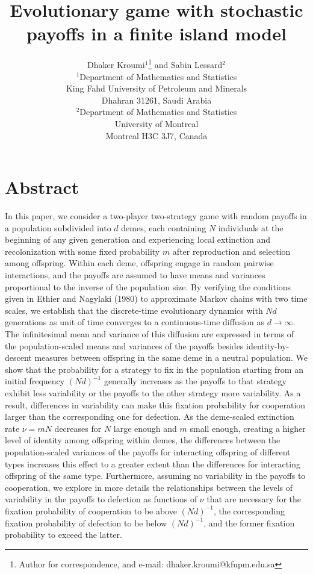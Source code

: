 \documentclass[11pt]{article}
\title{
\color{black}Evolutionary game with stochastic payoffs in a finite island model \color{black}}
\author{Dhaker Kroumi$^1$\footnote{Author for
correspondence, and e-mail: dhaker.kroumi@kfupm.edu.sa} and Sabin Lessard$^2$
\\$^1$Department of Mathematics and Statistics\\King Fahd University of Petroleum and Minerals\\Dhahran 31261, Saudi Arabia\\
$^2$Department of Mathematics and Statistics\\University of Montreal \\
 Montreal H3C 3J7, Canada\\
 }
\date{}
\begin{document}
\maketitle



\section*{Abstract}
In this paper, we consider a two-player two-strategy game with random payoffs in a population subdivided into $d$ demes, each containing $N$ individuals at the beginning of any given generation and experiencing local extinction and recolonization with some fixed probability $m$ after reproduction and selection among offspring. Within each deme, offspring engage in random pairwise interactions, and the payoffs are assumed to have means and variances proportional to the inverse of the population size. By verifying the conditions given in Ethier and Nagylaki (1980) to approximate Markov chains with two time scales, we establish that the discrete-time evolutionary dynamics with $Nd$ generations as unit of time converges to a continuous-time diffusion as $d\rightarrow\infty$. The infinitesimal mean and variance of this diffusion are expressed in terms of the population-scaled means and variances of the payoffs besides identity-by-descent measures between offspring in the same deme in a neutral population. We show that the probability for a strategy to fix in the population starting from an initial frequency $(Nd)^{-1}$ generally increases as the payoffs to that strategy exhibit less variability or the payoffs to the other strategy more variability. As a result, differences in variability can make this fixation probability for cooperation larger than the corresponding one for defection. As the deme-scaled extinction rate $\nu=mN$ decreases for $N$ large enough and $m$ small enough,  creating a higher level of identity among offspring within demes, the differences between the population-scaled variances of the payoffs for interacting offspring of different types increases this effect to a greater extent than the differences for interacting offspring of the same type. Furthermore, assuming no variability in the payoffs to cooperation, we explore in more details the relationships between the levels of variability in the payoffs to defection as functions of $\nu$ that are necessary for the fixation probability of cooperation to be above $(Nd)^{-1}$, the corresponding fixation probability of defection  to be below $(Nd)^{-1}$, and the former fixation probability to exceed the latter.
\end{document}
